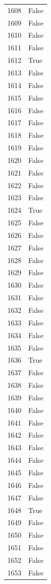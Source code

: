\documentclass[
  letterpaper,
  DIV=11,
  numbers=noendperiod]{scrreprt}
\begin{document}
\begin{tabular}{ll}
1608 &  False \\
1609 &  False \\
1610 &  False \\
1611 &  False \\
1612 &   True \\
1613 &  False \\
1614 &  False \\
1615 &  False \\
1616 &  False \\
1617 &  False \\
1618 &  False \\
1619 &  False \\
1620 &  False \\
1621 &  False \\
1622 &  False \\
1623 &  False \\
1624 &   True \\
1625 &  False \\
1626 &  False \\
1627 &  False \\
1628 &  False \\
1629 &  False \\
1630 &  False \\
1631 &  False \\
1632 &  False \\
1633 &  False \\
1634 &  False \\
1635 &  False \\
1636 &   True \\
1637 &  False \\
1638 &  False \\
1639 &  False \\
1640 &  False \\
1641 &  False \\
1642 &  False \\
1643 &  False \\
1644 &  False \\
1645 &  False \\
1646 &  False \\
1647 &  False \\
1648 &   True \\
1649 &  False \\
1650 &  False \\
1651 &  False \\
1652 &  False \\
1653 &  False \\

\end{tabular}
\end{document}
